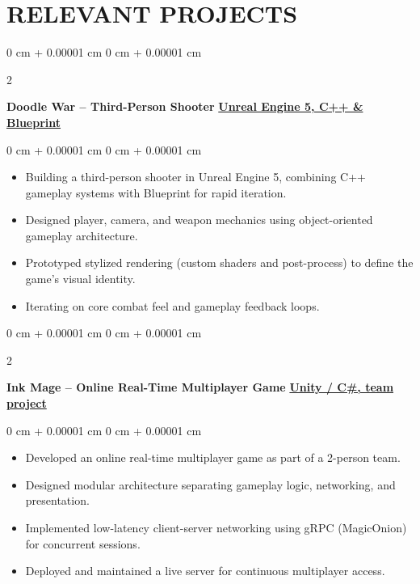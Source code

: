 \documentclass[10pt, letterpaper]{article}
\newenvironment{highlights}{
    \begin{itemize}[
        topsep=0.10 cm,
        parsep=0.10 cm,
        partopsep=0pt,
        itemsep=0pt,
        leftmargin=0 cm + 10pt
    ]
}{
    \end{itemize}
} %
\newenvironment{onecolentry}{
    \begin{adjustwidth}{
        0 cm + 0.00001 cm
    }{
        0 cm + 0.00001 cm
    }
}{
    \end{adjustwidth}
} %
\newenvironment{twocolentry}[2][]{
    \onecolentry
    \def\secondColumn{#2}
    \setcolumnwidth{\fill, 4.5 cm}
    \begin{paracol}{2}
}{
    \switchcolumn \raggedleft \secondColumn
    \end{paracol}
    \endonecolentry
} %
\begin{document}
    
\section{RELEVANT PROJECTS}

\begin{twocolentry}{
    \textbf{\href{https://yyi.llc/in_progress/paint/}{Unreal Engine 5, C++ \& Blueprint}}
}
    \textbf{Doodle War -- Third-Person Shooter}\end{twocolentry}

\vspace{0.10 cm}
\begin{onecolentry}
\begin{highlights}
    \item Building a third-person shooter in Unreal Engine 5, combining C++ gameplay systems with Blueprint for rapid iteration.
    \item Designed player, camera, and weapon mechanics using object-oriented gameplay architecture.
    \item Prototyped stylized rendering (custom shaders and post-process) to define the game's visual identity.
    \item Iterating on core combat feel and gameplay feedback loops.
\end{highlights}
\end{onecolentry}

\vspace{0.2 cm}

\begin{twocolentry}{
    \textbf{\href{https://yyi.llc/in_progress/ink_mage/}{Unity / C\#, team project}}
}
    \textbf{Ink Mage -- Online Real-Time Multiplayer Game}\end{twocolentry}

\vspace{0.10 cm}
\begin{onecolentry}
\begin{highlights}
    \item Developed an online real-time multiplayer game as part of a 2-person team.
    \item Designed modular architecture separating gameplay logic, networking, and presentation.
    \item Implemented low-latency client-server networking using gRPC (MagicOnion) for concurrent sessions.
    \item Deployed and maintained a live server for continuous multiplayer access.
\end{highlights}
\end{onecolentry}
\end{document}
